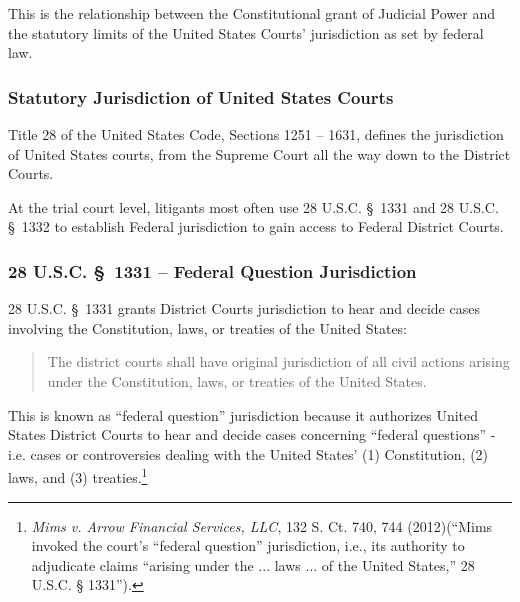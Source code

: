 This is the relationship between the Constitutional grant of Judicial Power and the statutory limits of the United States Courts' jurisdiction as set by federal law.


\subsubsection{Statutory Jurisdiction of United States Courts}


Title 28 of the United States Code, Sections 1251 -- 1631, defines the jurisdiction of United States courts, from the Supreme Court all the way down to the District Courts.



At the trial court level, litigants most often use 28 U.S.C. \S\ 1331 and 28 U.S.C. \S\ 1332 to establish Federal jurisdiction to gain access to Federal District Courts.

\subsubsection{28 U.S.C. \S\ 1331 -- Federal Question Jurisdiction}  28 U.S.C. \S\ 1331 grants District Courts jurisdiction to hear and decide cases involving the Constitution, laws, or treaties of the United States:

\begin{quote}
The district courts shall have original jurisdiction of all civil actions arising under the Constitution, laws, or treaties of the United States.
\end{quote}

This is known as ``federal question'' jurisdiction because it authorizes United States District Courts to hear and decide cases concerning ``federal questions'' - i.e. cases or controversies dealing with the United States' (1) Constitution, (2) laws, and (3) treaties.\footnote{
\textit{Mims v. Arrow Financial Services, LLC}, 132 S. Ct. 740, 744 (2012)(``Mims invoked the court's ``federal question'' jurisdiction, i.e., its authority to adjudicate claims ``arising under the ... laws ... of the United States,'' 28 U.S.C. § 1331'').}


